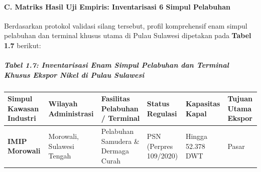 \documentclass[
]{article}
\newcounter{none} %
\begin{document}
\paragraph{C. Matriks Hasil Uji Empiris: Inventarisasi 6 Simpul
Pelabuhan}\label{c.-matriks-hasil-uji-empiris-inventarisasi-6-simpul-pelabuhan}

Berdasarkan protokol validasi silang tersebut, profil komprehensif enam
simpul pelabuhan dan terminal khusus utama di Pulau Sulawesi dipetakan
pada \textbf{Tabel 1.7} berikut:

\subparagraph{Tabel 1.7: Inventarisasi Enam Simpul Pelabuhan dan
Terminal Khusus Ekspor Nikel di Pulau
Sulawesi}\label{tabel-1.7-inventarisasi-enam-simpul-pelabuhan-dan-terminal-khusus-ekspor-nikel-di-pulau-sulawesi}

{\def\LTcaptype{none} %
\begin{longtable}[]{@{}
  >{\raggedright\arraybackslash}p{}
  >{\raggedright\arraybackslash}p{}
  >{\raggedright\arraybackslash}p{}
  >{\centering\arraybackslash}p{}
  >{\centering\arraybackslash}p{}
  >{\raggedright\arraybackslash}p{}@{}}
\toprule\noalign{}
\begin{minipage}[b]{\linewidth}\raggedright
Simpul Kawasan Industri
\end{minipage} & \begin{minipage}[b]{\linewidth}\raggedright
Wilayah Administrasi
\end{minipage} & \begin{minipage}[b]{\linewidth}\raggedright
Fasilitas Pelabuhan / Terminal
\end{minipage} & \begin{minipage}[b]{\linewidth}\centering
Status Regulasi
\end{minipage} & \begin{minipage}[b]{\linewidth}\centering
Kapasitas Kapal
\end{minipage} & \begin{minipage}[b]{\linewidth}\raggedright
Tujuan Utama Ekspor
\end{minipage} \\
\midrule\noalign{}
\endhead
\bottomrule\noalign{}
\endlastfoot
\textbf{IMIP Morowali} & Morowali, Sulawesi Tengah & Pelabuhan Samudera
\& Dermaga Curah & PSN (Perpres 109/2020) & Hingga 52.378 DWT & Pasar

\end{longtable}}
\end{document}
